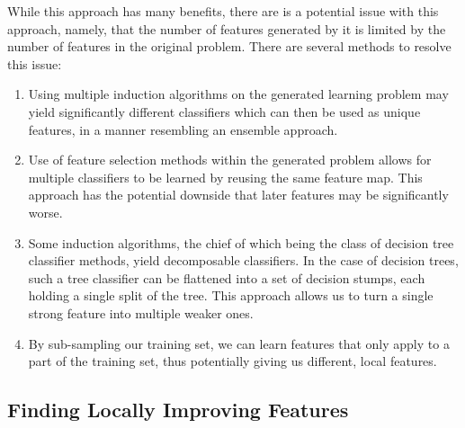 \documentclass[twoside,11pt]{article}
\theoremstyle{definition}
\begin{document}
While this approach has many benefits, there are is a potential issue with this approach, namely, that the number of features generated by it is limited by the number of features in the original problem. There are several methods to resolve this issue:
\begin{enumerate}
	\item Using multiple induction algorithms on the generated learning problem may yield significantly different classifiers which can then be used as unique features, in a manner resembling an ensemble approach.
	\item Use of feature selection methods within the generated problem allows for multiple classifiers to be learned by reusing the same feature map. This approach has the potential downside that later features may be significantly worse.
	\item Some induction algorithms, the chief of which being the class of decision tree classifier methods, yield decomposable classifiers. In the case of decision trees, such a tree classifier can be flattened into a set of decision stumps, each holding a single split of the tree. This approach allows us to turn a single strong feature into multiple weaker ones.
	\item By sub-sampling our training set, we can learn features that only apply to a part of the training set, thus potentially giving us different, local features.
\end{enumerate}

\subsection{Finding Locally Improving Features} \label{tree_usage}
\end{document}
